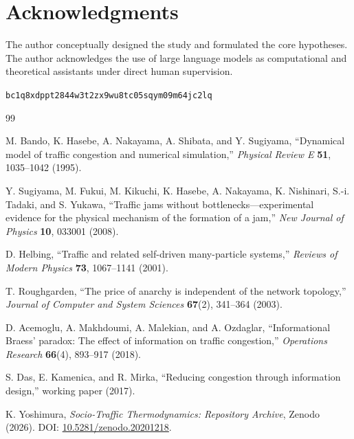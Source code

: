\documentclass[11pt]{article}
\begin{document}
\section*{Acknowledgments}
The author conceptually designed the study and formulated the core hypotheses. The author acknowledges the use of large language models as computational and theoretical assistants under direct human supervision.

\begin{center}
\footnotesize\texttt{bc1q8xdppt2844w3t2zx9wu8tc05sqym09m64jc2lq}
\end{center}

\begin{thebibliography}{99}

M. Bando, K. Hasebe, A. Nakayama, A. Shibata, and Y. Sugiyama,
``Dynamical model of traffic congestion and numerical simulation,''
\emph{Physical Review E} \textbf{51}, 1035--1042 (1995).

Y. Sugiyama, M. Fukui, M. Kikuchi, K. Hasebe, A. Nakayama, K. Nishinari, S.-i. Tadaki, and S. Yukawa,
``Traffic jams without bottlenecks---experimental evidence for the physical mechanism of the formation of a jam,''
\emph{New Journal of Physics} \textbf{10}, 033001 (2008).

D. Helbing,
``Traffic and related self-driven many-particle systems,''
\emph{Reviews of Modern Physics} \textbf{73}, 1067--1141 (2001).

T. Roughgarden,
``The price of anarchy is independent of the network topology,''
\emph{Journal of Computer and System Sciences} \textbf{67}(2), 341--364 (2003).

D. Acemoglu, A. Makhdoumi, A. Malekian, and A. Ozdaglar,
``Informational Braess' paradox: The effect of information on traffic congestion,''
\emph{Operations Research} \textbf{66}(4), 893--917 (2018).

S. Das, E. Kamenica, and R. Mirka,
``Reducing congestion through information design,''
working paper (2017).


K. Yoshimura,
\emph{Socio-Traffic Thermodynamics: Repository Archive},
Zenodo (2026).
DOI: \href{https://doi.org/10.5281/zenodo.20201218}{10.5281/zenodo.20201218}.

\end{thebibliography}
\end{document}
